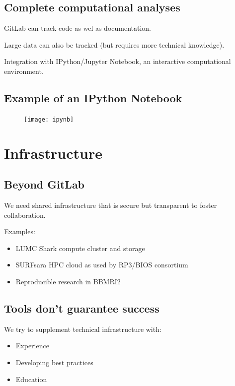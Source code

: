 \documentclass[slidestop]{beamer}
\begin{document}
\subsection{Complete computational analyses}
\begin{pframe}
  GitLab can track code as wel as documentation.

  \bigskip
  Large data can also be tracked (but requires more technical knowledge).

  \bigskip
  Integration with IPython/Jupyter Notebook, an interactive computational
  environment.
\end{pframe}

\subsection{Example of an IPython Notebook}
\begin{pframe}
  \begin{figure}[ht!]
    \centering
    \texttt{[image: ipynb]}
  \end{figure}
\end{pframe}

\section{Infrastructure}
\subsection{Beyond GitLab}
\begin{pframe}
  We need shared infrastructure that is secure but transparent to foster
  collaboration.

  \bigskip
  Examples:
  \begin{itemize}
    \item LUMC Shark compute cluster and storage
    \item SURFsara HPC cloud as used by RP3/BIOS consortium
    \item Reproducible research in BBMRI2
  \end{itemize}
\end{pframe}

\subsection{Tools don't guarantee success}
\begin{pframe}
  We try to supplement technical infrastructure with:
  \begin{itemize}
    \item Experience
    \item Developing best practices
    \item Education
  \end{itemize}
\end{pframe}
\end{document}

